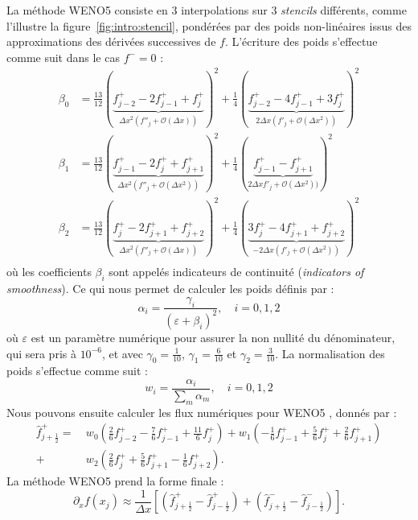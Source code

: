 La méthode WENO5 consiste en 3 interpolations sur 3 \emph{stencils} différents, comme l'illustre la figure~\ref{fig:intro:stencil}, pondérées par des poids non-linéaires issus des approximations des dérivées successives de $f$. L'écriture des poids s'effectue comme suit dans le cas $f^-=0$ :
$$
  \begin{aligned}
    \beta_0 &= \frac{13}{12}( \underbrace{f^+_{j-2} - 2f^+_{j-1} + f^+_{j}}_{\Delta x^2(f''_{j} + \mathcal{O}(\Delta x))})^2   + \frac{1}{4}( \underbrace{  f^+_{j-2} - 4f^+_{j-1} + 3f^+_{j}  }_{ 2\Delta x ( f'_{j} + \mathcal{O}(\Delta x^2))})^2 \\
    \beta_1 &= \frac{13}{12}( \underbrace{f^+_{j-1} - 2f^+_{j}   + f^+_{j+1}}_{\Delta x^2(f''_{j} + \mathcal{O}(\Delta x^2))} )^2 + \frac{1}{4}( \underbrace{  f^+_{j-1} -               f^+_{j+1}}_{ 2\Delta x   f'_{j} + \mathcal{O}(\Delta x^2))})^2 \\
    \beta_2 &= \frac{13}{12}( \underbrace{f^+_{j}   - 2f^+_{j+1} + f^+_{j+2}}_{\Delta x^2(f''_{j} + \mathcal{O}(\Delta x))} )^2   + \frac{1}{4}( \underbrace{ 3f^+_{j}   - 4f^+_{j+1} +  f^+_{j+2}}_{-2\Delta x ( f'_{j} + \mathcal{O}(\Delta x^2))})^2 \\
  \end{aligned}
$$
où les coefficients $\beta_i$ sont appelés indicateurs de continuité (\emph{indicators of smoothness}). Ce qui nous permet de calculer les poids définis par :
$$
  \alpha_i = \frac{\gamma_i}{(\varepsilon + \beta_i)^2},\quad i=0,1,2
$$
où $\varepsilon$ est un paramètre numérique pour assurer la non nullité du dénominateur, qui sera pris à $10^{-6}$, et avec $\gamma_0=\frac{1}{10}$, $\gamma_1=\frac{6}{10}$ et $\gamma_2=\frac{3}{10}$. La normalisation des poids s'effectue comme suit :
$$
  w_i = \frac{\alpha_i}{\sum_m \alpha_m},\quad i=0,1,2
$$
Nous pouvons ensuite calculer les flux numériques pour WENO5 \cite{Shu:2003}, donnés par :
$$
  \begin{aligned}
    \hat{f}_{j+\frac{1}{2}}^+   =\ & w_0\left(  \frac{2}{6}f^+_{j-2} - \frac{7}{6}f^+_{j-1} + \frac{11}{6}f^+_{j}   \right)
                                +    w_1\left( -\frac{1}{6}f^+_{j-1} + \frac{5}{6}f^+_{j}   +  \frac{2}{6}f^+_{j+1} \right) \\
                                +  & w_2\left(  \frac{2}{6}f^+_{j}   + \frac{5}{6}f^+_{j+1} -  \frac{1}{6}f^+_{j+2} \right).
  \end{aligned}
$$
La méthode WENO5 prend la forme finale :
$$
  \partial_xf(x_j) \approx \frac{1}{\Delta x}\left[ \left(\hat{f}_{j+\frac{1}{2}}^+ - \hat{f}_{j-\frac{1}{2}}^+ \right) + \left(\hat{f}_{j+\frac{1}{2}}^- - \hat{f}_{j-\frac{1}{2}}^- \right) \right].
$$

